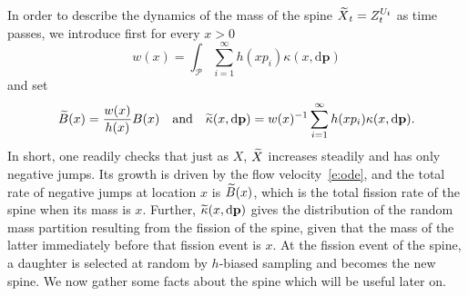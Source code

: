 \documentclass[11pt]{article}
\theoremstyle{definition}
\providecommand{\mathof}[1]{\mathrm{#1}}
\numberwithin{equation}{section}
\numberwithin{figure}{section}
\numberwithin{table}{section}
\newcommand\Pp{\mathcal{P}}
\newcommand\pp{\mathbf{p}}
\newcommand\dd{\mathof{d}}
\let\oldtilde\tilde
\renewcommand*{\tilde}[1]{\mathchoice{\widetilde{#1}}{\widetilde{#1}}{\oldtilde{#1}}{\oldtilde{#1}}}
\begin{document}
In order to describe the dynamics of the mass of the spine $\tilde X_t=Z^{U_t}_t$ as time passes, we introduce first for every $x>0$
\[
w(x)=\int_{\Pp}\sum_{i=1}^{\infty} h(xp_i) \kappa(x, \dd \pp)
\]
and set
\begin{equation}\label{e:ratespine}
\tilde {B}(x)= \frac{w(x)}{h(x)}{B}(x)\quad\text{and}\quad \tilde \kappa(x, \dd \pp)= w(x)^{-1} \sum_{i=1}^{\infty} h(xp_i) \kappa(x, \dd \pp).
\end{equation}
In short, one readily checks that just as $X$, $\tilde X$ increases steadily and has only negative jumps. Its growth is driven by the flow velocity~\eqref{e:ode}, and the total rate of negative jumps at location $x$ is $\tilde {B}(x)$, which is the total fission rate of the spine when its mass is $x$. Further, $\tilde \kappa(x, \dd \pp)$ gives the distribution of the random mass partition resulting from the fission of the spine, given that the mass of the latter immediately before that fission event is $x$. At the fission event of the spine, a daughter is selected at random by $h$-biased sampling and becomes the new spine. We now gather some facts about the spine which will be useful later on.
\end{document}
